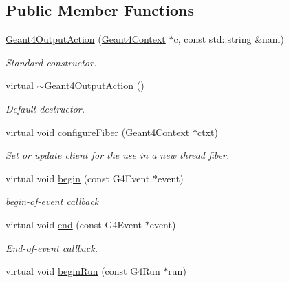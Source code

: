 \subsection*{Public Member Functions}
\begin{DoxyCompactItemize}
\item 
\hyperlink{class_d_d4hep_1_1_simulation_1_1_geant4_output_action_a095341c53692a4dda8e7af42075691a2}{Geant4\+Output\+Action} (\hyperlink{class_d_d4hep_1_1_simulation_1_1_geant4_context}{Geant4\+Context} $\ast$c, const std\+::string \&nam)
\begin{DoxyCompactList}\small\item\em Standard constructor. \end{DoxyCompactList}\item 
virtual \hyperlink{class_d_d4hep_1_1_simulation_1_1_geant4_output_action_aeead76ac5f330277dfb11c924bbfbc08}{$\sim$\+Geant4\+Output\+Action} ()
\begin{DoxyCompactList}\small\item\em Default destructor. \end{DoxyCompactList}\item 
virtual void \hyperlink{class_d_d4hep_1_1_simulation_1_1_geant4_output_action_abc1171027ea0a21fedef2d49a14ec557}{configure\+Fiber} (\hyperlink{class_d_d4hep_1_1_simulation_1_1_geant4_context}{Geant4\+Context} $\ast$ctxt)
\begin{DoxyCompactList}\small\item\em Set or update client for the use in a new thread fiber. \end{DoxyCompactList}\item 
virtual void \hyperlink{class_d_d4hep_1_1_simulation_1_1_geant4_output_action_afaad36616c890ac39e80421d340efd47}{begin} (const G4\+Event $\ast$event)
\begin{DoxyCompactList}\small\item\em begin-\/of-\/event callback \end{DoxyCompactList}\item 
virtual void \hyperlink{class_d_d4hep_1_1_simulation_1_1_geant4_output_action_a6fa4e933973a42a00b7be10292619780}{end} (const G4\+Event $\ast$event)
\begin{DoxyCompactList}\small\item\em End-\/of-\/event callback. \end{DoxyCompactList}\item 
virtual void \hyperlink{class_d_d4hep_1_1_simulation_1_1_geant4_output_action_afc8b13d72433d8f917555e952e1ce528}{begin\+Run} (const G4\+Run $\ast$run)

\end{DoxyCompactItemize}
